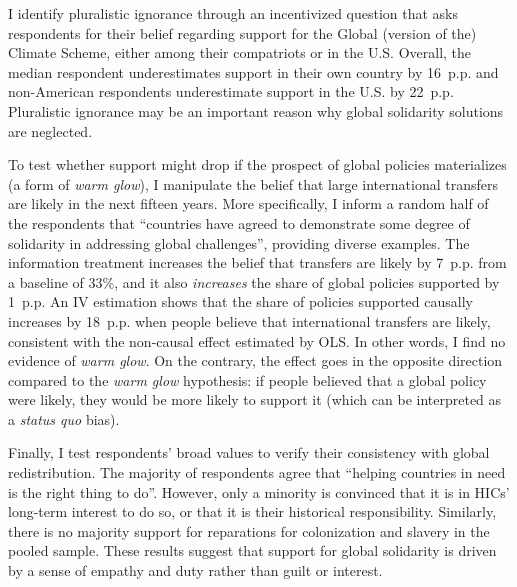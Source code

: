 \documentclass[12pt,english]{article}
\begin{document}
\begin{bibunit}
I identify pluralistic ignorance through an incentivized question that asks respondents for their belief regarding support for the Global (version of the) Climate Scheme, either among their compatriots or in the U.S. %
Overall, the median respondent underestimates support in their own country by 16~p.p. and non-American respondents underestimate support in the U.S. by 22~p.p. Pluralistic ignorance may be an important reason why global solidarity solutions are neglected.

To test whether support might drop if the prospect of global policies materializes (a form of \textit{warm glow}), I manipulate the belief that large international transfers are likely in the next fifteen years. More specifically, I inform a random half of the respondents that ``countries have agreed to demonstrate some
degree of solidarity in addressing global challenges'', providing diverse examples. %
The information treatment increases the belief that transfers are likely by 7~p.p. from a baseline of 33\%, and it %
also \textit{increases} the share of global policies supported by 1~p.p. %
An IV estimation shows that the share of policies supported causally increases by 18~p.p. when people believe that international transfers are likely, %
consistent with the non-causal effect estimated by OLS. 
In other words, I find no evidence of \textit{warm glow}. On the contrary, the effect goes in the opposite direction compared to the \textit{warm glow} hypothesis: if people believed that a global policy were likely, they would be more likely to support it (which can be interpreted as %
a \textit{status quo} bias). 

Finally, I test respondents' broad values to verify their consistency with global redistribution. The majority of respondents agree that ``helping countries in need is the right thing to do''. However, only a minority is convinced that it is in HICs' long-term interest to do so, or that it is their historical responsibility. Similarly, there is no majority support for reparations for colonization and slavery in the pooled sample. These results suggest that support for global solidarity is driven by a sense of empathy and duty rather than guilt or interest. 


\end{bibunit}
\end{document}
